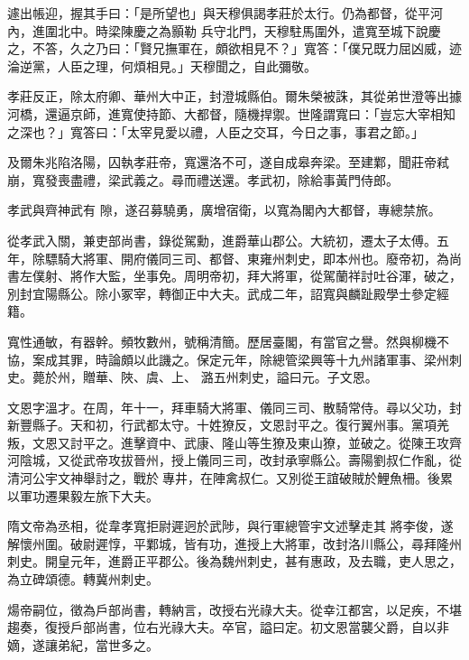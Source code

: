 \begin{pinyinscope}
 遽出帳迎，握其手曰：「是所望也」與天穆俱謁孝莊於太行。仍為都督，從平河內，進圍北中。時梁陳慶之為顥勒
 兵守北門，天穆駐馬圍外，遣寬至城下說慶之，不答，久之乃曰：「賢兄撫軍在，頗欲相見不？」寬答：「僕兄既力屈凶威，迹淪逆黨，人臣之理，何煩相見。」天穆聞之，自此彌敬。



 孝莊反正，除太府卿、華州大中正，封澄城縣伯。爾朱榮被誅，其從弟世澄等出據河橋，還逼京師，進寬使持節、大都督，隨機捍禦。世隆謂寬曰：「豈忘大宰相知之深也？」寬答曰：「太宰見愛以禮，人臣之交耳，今日之事，事君之節。」



 及爾朱兆陷洛陽，囚執孝莊帝，寬還洛不可，遂自成皋奔梁。至建鄴，聞莊帝弒崩，寬發喪盡禮，梁武義之。尋而禮送還。孝武初，除給事黃門侍郎。



 孝武與齊神武有
 隙，遂召募驍勇，廣增宿衛，以寬為閣內大都督，專總禁旅。



 從孝武入關，兼吏部尚書，錄從駕勳，進爵華山郡公。大統初，遷太子太傅。五年，除驃騎大將軍、開府儀同三司、都督、東雍州刺史，即本州也。廢帝初，為尚書左僕射、將作大監，坐事免。周明帝初，拜大將軍，從駕蘭祥討吐谷渾，破之，別封宜陽縣公。除小冢宰，轉御正中大夫。武成二年，詔寬與麟趾殿學士參定經籍。



 寬性通敏，有器幹。頻牧數州，號稱清簡。歷居臺閣，有當官之譽。然與柳機不協，案成其罪，時論頗以此譏之。保定元年，除總管梁興等十九州諸軍事、梁州刺史。薨於州，贈華、陜、虞、上、
 潞五州刺史，謚曰元。子文恩。



 文恩字溫才。在周，年十一，拜車騎大將軍、儀同三司、散騎常侍。尋以父功，封新豐縣子。天和初，行武都太守。十姓獠反，文恩討平之。復行翼州事。黨項羌叛，文恩又討平之。進擊資中、武康、隆山等生獠及東山獠，並破之。從陳王攻齊河陰城，又從武帝攻拔晉州，授上儀同三司，改封承寧縣公。壽陽劉叔仁作亂，從清河公宇文神舉討之，戰於專井，在陣禽叔仁。又別從王誼破賊於鯉魚柵。後累以軍功遷果毅左旅下大夫。



 隋文帝為丞相，從韋孝寬拒尉遲迥於武陟，與行軍總管宇文述擊走其
 將李俊，遂解懷州圍。破尉遲惇，平鄴城，皆有功，進授上大將軍，改封洛川縣公，尋拜隆州刺史。開皇元年，進爵正平郡公。後為魏州刺史，甚有惠政，及去職，吏人思之，為立碑頌德。轉冀州刺史。



 煬帝嗣位，徵為戶部尚書，轉納言，改授右光祿大夫。從幸江都宮，以足疾，不堪趨奏，復授戶部尚書，位右光祿大夫。卒官，謚曰定。初文恩當襲父爵，自以非嫡，遂讓弟紀，當世多之。




\end{pinyinscope}
